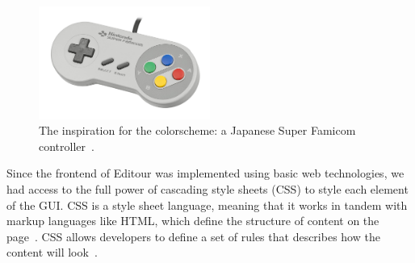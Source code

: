 \documentclass[a4paper, 10pt, american, titlepage]{article}
\begin{document}
\begin{figure}[h]
	\centering
	\includegraphics[width=0.5\textwidth]{super-famicom-controller.jpg}
    \caption[A Japanese Super Famicom controller.]{The inspiration for the
    colorscheme: a Japanese Super Famicom controller~\autocite{amos2017}.}
    \label{fig:superFamicomController}
\end{figure}

Since the frontend of Editour was implemented using basic web technologies, we
had access to the full power of cascading style sheets (CSS) to style each
element of the GUI. CSS is a style sheet language, meaning that it works in
tandem with markup languages like HTML, which define the structure of content on
the page~\autocite{mozillahtml2019}. CSS allows developers to define a set of
rules that describes how the content will look~\autocite{mozillacss2019}.
\end{document}
